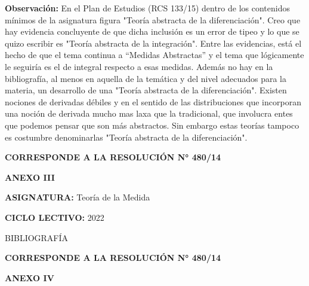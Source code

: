 \documentclass[a4paper, 12pt]{article}
\begin{document}
\noindent\textbf{Observación:} En el Plan de Estudios (RCS 133/15) dentro de los contenidos mínimos de la asignatura figura "Teoría abstracta de la diferenciación". Creo que hay evidencia concluyente de que dicha inclusión es un error de tipeo y lo que se quizo escribir es "Teoría abstracta de la integración". Entre las evidencias, está el hecho de que el tema continua a ``Medidas Abstractas'' y el tema que lógicamente le seguiría es el de integral respecto a esas medidas. Además no hay en la bibliografía, al menos en aquella de la temática y del nivel adecuados para la materia, un desarrollo de una "Teoría abstracta de la diferenciación". Existen nociones de derivadas débiles y en el sentido de las distribuciones que incorporan una noción de derivada mucho mas laxa que la tradicional, que involucra entes que podemos pensar que son más abstractos. Sin embargo estas teorías tampoco es costumbre denominarlas "Teoría abstracta de la diferenciación". 





\newpage






\begin{flushleft}
 \textbf{\large CORRESPONDE A LA RESOLUCIÓN N° 480/14}
\end{flushleft}


\begin{center}
 \textbf{\large ANEXO III}
\end{center}





 \textbf{ASIGNATURA:} Teoría de la Medida

 \textbf{CICLO LECTIVO:} 2022
 
BIBLIOGRAFÍA


%
%
\nocite{*}

  

  
  
\newpage






\begin{flushleft}
 \textbf{\large CORRESPONDE A LA RESOLUCIÓN N° 480/14}
\end{flushleft}


\begin{center}
 \textbf{\large ANEXO IV}
\end{center}
\end{document}
